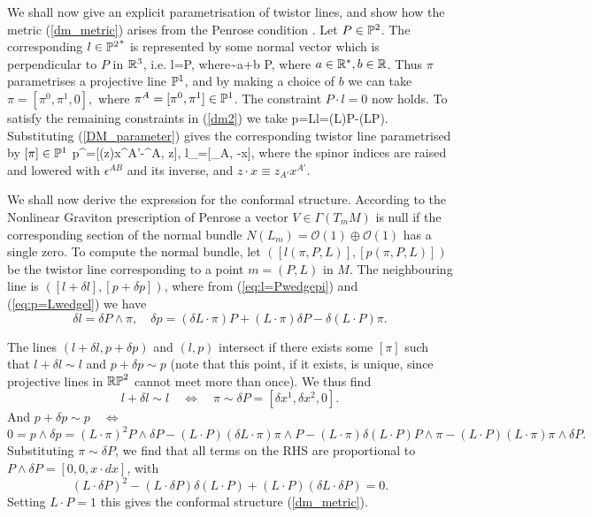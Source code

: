 We shall now give an explicit parametrisation of twistor lines, and show how 
the metric (\ref{dm_metric}) arises from the Penrose condition 
\cite{penrose, ward}.
Let $P\in \mathbb{P}^2$. The corresponding $l\in {\mathbb{P}^2}^*$ is represented by some normal vector which is perpendicular to $P$ in $\mathbb{R}^3$, i.e.
\be \label{eq:l=Pwedgepi}
l=P\wedge \pi, \quad \mbox{where}\quad  \pi\sim a\pi+b P,
\ee
where $a\in \mathbb{R}^*, b\in \mathbb{R}$. Thus $\pi$ parametrises a projective line $\mathbb{P}^1$,
and by making a choice of $b$ we can take
$
\pi=[\pi^0, \pi^1, 0], 
$ where $\pi^A=[\pi^0, \pi^1]\in \mathbb{P}^1$. The constraint $P\cdot l=0$ now holds.
To satisfy the remaining constraints in (\ref{dm2}) we take
\be \label{eq:p=Lwedgel}
p=L\wedge l=(L\cdot\pi)P-(L\cdot P)\pi.
\ee
Substituting (\ref{DM_parameter}) gives 
the corresponding twistor line parametrised by $[\pi]\in\mathbb{P}^1$ 
\be
\label{sl3curves}
p^{\alpha}=[(z\cdot \pi)x^{A'}-\pi^A, z\cdot \pi], \quad l_\alpha=[\pi_A, -\pi\cdot x],
\ee
where the spinor indices are raised and lowered with $\epsilon^{AB}$ and its inverse, and  $z\cdot x\equiv z_{A'}x^{A'}$. 

We shall now derive the expression for the conformal structure. According
to the Nonlinear Graviton prescription of Penrose \cite{penrose} a vector
$V\in \Gamma(T_mM)$ is null if the corresponding section
of the normal bundle $N(L_m)={\mathcal O}(1)\oplus{\mathcal O}(1)$ has a 
single zero. To compute the normal bundle, let $([l(\pi, P, L)], 
[p(\pi, P, L)])$
be the twistor line corresponding to a point $m=(P, L)$ in $M$. The neighbouring line is $([l+\delta l], [p+\delta p])$, where from (\ref{eq:l=Pwedgepi}) and (\ref{eq:p=Lwedgel}) we have
\[
\delta l=\delta P\wedge \pi, \quad
\delta p= (\delta L\cdot \pi)P+(L\cdot\pi) \delta P-\delta (L\cdot P)\pi.
\]

The lines  $(l+\delta l, p+\delta p)$  and $(l, p)$ intersect if there exists some $[\pi]$ such that $l+\delta l\sim l$ and $p+\delta p\sim p$ (note that this point, if it exists, is unique, since projective lines in $\mathbb{RP}^2$ cannot meet more than once). We thus find
\[
l+\delta l\sim l \quad \iff \quad\pi\sim\delta P=[\delta x^1, \delta x^2, 0].
\]
And $p+\delta p\sim p \quad \iff$
\[
0=p\wedge \delta p=(L\cdot \pi)^2P\wedge \delta P-(L\cdot P)
(\delta L\cdot \pi)\pi\wedge P-(L\cdot \pi)\delta (L\cdot P)P\wedge \pi-
(L\cdot P)(L\cdot \pi) \pi\wedge \delta P.
\]
Substituting $\pi\sim\delta P$, we find that all terms on the RHS are proportional to $P\wedge \delta P=[0, 0, x\cdot dx]$, with
\[
(L\cdot \delta P)^2-(L\cdot \delta P)\delta(L\cdot P)+(L\cdot P)(\delta L\cdot \delta P)=0.
\]
Setting $L\cdot P=1$ this gives the conformal structure 
(\ref{dm_metric}).
